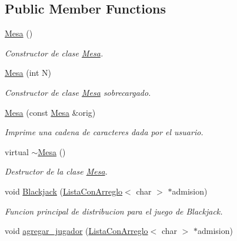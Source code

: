 \subsection*{Public Member Functions}
\begin{DoxyCompactItemize}
\item 
\hypertarget{class_mesa_a98794038db53804cb4295480c96b2c20}{}\label{class_mesa_a98794038db53804cb4295480c96b2c20} 
\hyperlink{class_mesa_a98794038db53804cb4295480c96b2c20}{Mesa} ()
\begin{DoxyCompactList}\small\item\em Constructor de clase \hyperlink{class_mesa}{Mesa}. \end{DoxyCompactList}\item 
\hyperlink{class_mesa_a8cb7a7932e52b13242eaa5ade9f646cb}{Mesa} (int N)
\begin{DoxyCompactList}\small\item\em Constructor de clase \hyperlink{class_mesa}{Mesa} sobrecargado. \end{DoxyCompactList}\item 
\hyperlink{class_mesa_af28f64b3a29b75d2a281dbc1d439a74e}{Mesa} (const \hyperlink{class_mesa}{Mesa} \&orig)
\begin{DoxyCompactList}\small\item\em Imprime una cadena de caracteres dada por el usuario. \end{DoxyCompactList}\item 
\hypertarget{class_mesa_aa0a1b83b8058f80f4f27ec46cc5e9524}{}\label{class_mesa_aa0a1b83b8058f80f4f27ec46cc5e9524} 
virtual \hyperlink{class_mesa_aa0a1b83b8058f80f4f27ec46cc5e9524}{$\sim$\+Mesa} ()
\begin{DoxyCompactList}\small\item\em Destructor de la clase \hyperlink{class_mesa}{Mesa}. \end{DoxyCompactList}\item 
void \hyperlink{class_mesa_a567e239c0dedc7d2aadb0633b4f1580b}{Blackjack} (\hyperlink{class_lista_con_arreglo}{Lista\+Con\+Arreglo}$<$ char $>$ $\ast$admision)
\begin{DoxyCompactList}\small\item\em Funcion principal de distribucion para el juego de Blackjack. \end{DoxyCompactList}\item 
void \hyperlink{class_mesa_ad8160d20365c5d6e8434e2ebd2c75b06}{agregar\+\_\+jugador} (\hyperlink{class_lista_con_arreglo}{Lista\+Con\+Arreglo}$<$ char $>$ $\ast$admision)

\end{DoxyCompactItemize}
